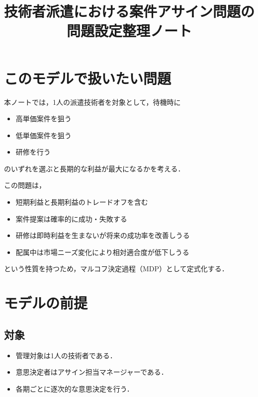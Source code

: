 \documentclass[11pt,a4paper]{bxjsarticle}
\title{技術者派遣における案件アサイン問題の問題設定整理ノート}
\author{}
\date{}
\begin{document}
\maketitle

\section{このモデルで扱いたい問題}

本ノートでは，1人の派遣技術者を対象として，待機時に
\begin{itemize}[leftmargin=2em]
    \item 高単価案件を狙う
    \item 低単価案件を狙う
    \item 研修を行う
\end{itemize}
のいずれを選ぶと長期的な利益が最大になるかを考える．

この問題は，
\begin{itemize}[leftmargin=2em]
    \item 短期利益と長期利益のトレードオフを含む
    \item 案件提案は確率的に成功・失敗する
    \item 研修は即時利益を生まないが将来の成功率を改善しうる
    \item 配属中は市場ニーズ変化により相対適合度が低下しうる
\end{itemize}
という性質を持つため，マルコフ決定過程（MDP）として定式化する．

\section{モデルの前提}

\subsection{対象}
\begin{itemize}[leftmargin=2em]
    \item 管理対象は1人の技術者である．
    \item 意思決定者はアサイン担当マネージャーである．
    \item 各期ごとに逐次的な意思決定を行う．
\end{itemize}
\end{document}
